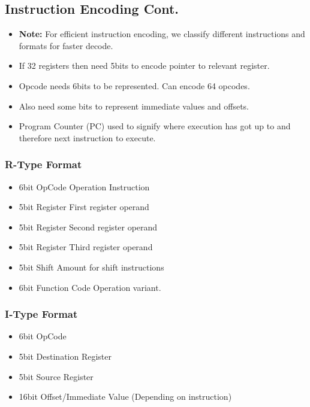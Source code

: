 \documentclass{article}
\newcommand\tab[1][0.5cm]{\hspace*{#1}}
\begin{document}
	\subsection*{Instruction Encoding Cont.}
		\begin{itemize}
			\item \textbf{Note: } For efficient instruction encoding, we classify different instructions and formats for faster decode.
			\item If 32 registers then need 5bits to encode pointer to relevant register.
			\item Opcode needs 6bits to be represented. Can encode 64 opcodes.
			\item Also need some bits to represent immediate values and offsets.
			\item Program Counter (PC) used to signify where execution has got up to and therefore next instruction to execute.
			
		\end{itemize}

		\subsubsection*{R-Type Format}
			\begin{itemize}
				\item 6bit OpCode \tab \tab \tab Operation Instruction
				\item 5bit Register \tab \tab \tab First register operand
				\item 5bit Register \tab \tab \tab Second register operand
				\item 5bit Register \tab \tab \tab Third register operand
				\item 5bit Shift \tab \tab \tab \tab Amount for shift instructions
				\item 6bit Function Code \tab Operation variant.
			\end{itemize}


		\subsubsection*{I-Type Format}
			\begin{itemize}
				\item 6bit OpCode
				\item 5bit Destination Register
				\item 5bit Source Register
				\item 16bit Offset/Immediate Value (Depending on instruction)
			\end{itemize}
\end{document}
